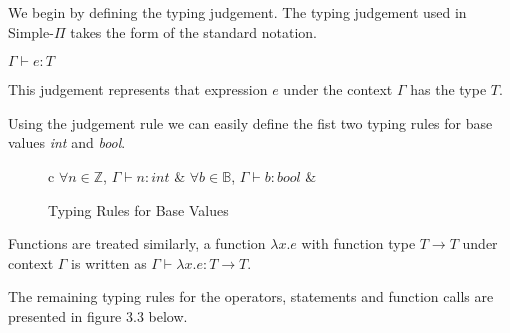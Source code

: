 \documentclass[a4paper,12pt]{report}
\begin{document}
\par
We begin by defining the typing judgement. The typing judgement used in 
Simple-$\Pi$ takes the form of the standard notation. 
\begin{center}
  $\Gamma \vdash e : T$
\end{center}
This judgement represents that expression $e$ under the context $\Gamma$ has the 
type $T$.

\par
Using the judgement rule we can easily define the fist two typing rules for base 
values \textit{int} and \textit{bool}.

\begin{figure}[H]
  \begin{center}
    \begin{tabular} {c}
      $\forall n \in \mathbb{Z}$, $\Gamma \vdash n : int$ & 
      $\forall b \in \mathbb{B}$, $\Gamma \vdash b : bool$ &       
    \end{tabular}
  \end{center}
  \caption{Typing Rules for Base Values}
\end{figure}

\par
Functions are treated similarly, a function $\lambda x.e$ with function type 
$T \longrightarrow T$ under context $\Gamma$ is written as 
$\Gamma \vdash \lambda x.e : T \longrightarrow T$.

\par
The remaining typing rules for the operators, statements and function 
calls are presented in figure 3.3 below.
\end{document}
